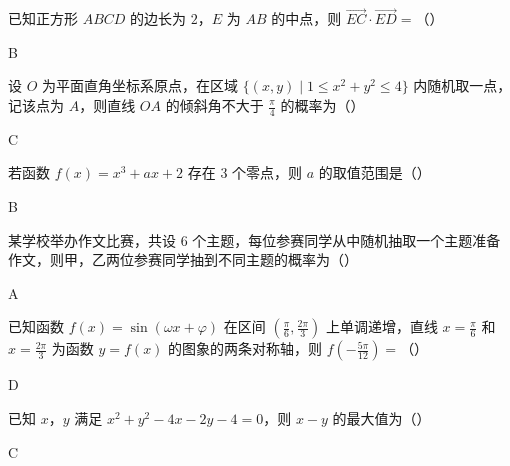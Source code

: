 \begin{problem}
已知正方形 \(ABCD\) 的边长为 \(2\)，\(E\) 为 \(AB\) 的中点，则 \(\overrightarrow{EC}\cdot\overrightarrow{ED}=\)（\quad）

\begin{answer}
B
\end{answer}
\end{problem}

\begin{problem}
设 \(O\) 为平面直角坐标系原点，在区域 \(\{(x,y)\mid1\le x^2+y^2\le4\}\) 内随机取一点，记该点为 \(A\)，则直线 \(OA\) 的倾斜角不大于 \(\frac\pi4\) 的概率为（\quad）

\begin{answer}
C
\end{answer}
\end{problem}

\begin{problem}
若函数 \(f(x)=x^3+ax+2\) 存在 \(3\) 个零点，则 \(a\) 的取值范围是（\quad）

\begin{answer}
B
\end{answer}
\end{problem}

\begin{problem}
某学校举办作文比赛，共设 \(6\) 个主题，每位参赛同学从中随机抽取一个主题准备作文，则甲，乙两位参赛同学抽到不同主题的概率为（\quad）

\begin{answer}
A
\end{answer}
\end{problem}

\begin{problem}
已知函数 \(f(x)=\sin(\omega x+\varphi)\) 在区间 \(\left(\frac\pi6,\frac{2\pi}3\right)\) 上单调递增，直线 \(x=\frac\pi6\) 和 \(x=\frac{2\pi}3\) 为函数 \(y=f(x)\) 的图象的两条对称轴，则 \(f\left(-\frac{5\pi}{12}\right)=\)（\quad）

\begin{answer}
D
\end{answer}
\end{problem}

\begin{problem}
已知 \(x\)，\(y\) 满足 \(x^2+y^2-4x-2y-4=0\)，则 \(x-y\) 的最大值为（\quad）

\begin{answer}
C
\end{answer}
\end{problem}

